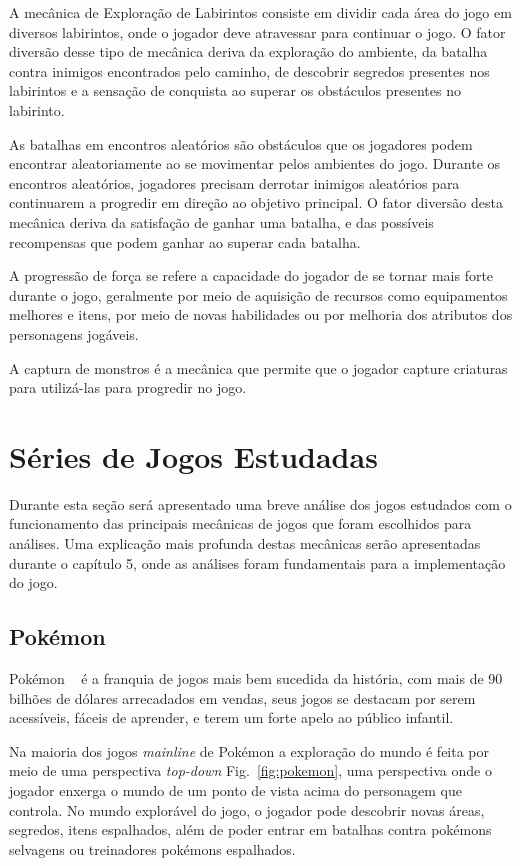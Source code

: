 \documentclass[
	12pt,				%
	openright,			%
	twoside,			%
	a4paper,			%
	english,			%
	french,				%
	spanish,			%
	brazil				%
	]{abntex2}
\begin{document}
	A mecânica de Exploração de Labirintos consiste em dividir cada área do jogo em diversos labirintos, onde o jogador deve atravessar para continuar o jogo. O fator diversão desse tipo de mecânica deriva da exploração do ambiente, da batalha contra inimigos encontrados pelo caminho, de descobrir segredos presentes nos labirintos e a sensação de conquista ao superar os obstáculos presentes no labirinto. 

	As batalhas em encontros aleatórios são obstáculos que os jogadores podem encontrar aleatoriamente ao se movimentar pelos ambientes do jogo. Durante os encontros aleatórios, jogadores precisam derrotar inimigos aleatórios para continuarem a progredir em direção ao objetivo principal. O fator diversão desta mecânica deriva da satisfação de ganhar uma batalha, e das possíveis recompensas que podem ganhar ao superar cada batalha.

	A progressão de força se refere a capacidade do jogador de se tornar mais forte durante o jogo, geralmente por meio de aquisição de recursos como equipamentos melhores e itens, por meio de novas habilidades ou por melhoria dos atributos dos personagens jogáveis. 

	A captura de monstros é a mecânica que permite que o jogador capture criaturas para utilizá-las para progredir no jogo.

\section{Séries de Jogos Estudadas}

Durante esta seção será apresentado uma breve análise dos jogos estudados com o funcionamento das principais mecânicas de jogos que foram escolhidos para análises. Uma explicação mais profunda destas mecânicas serão apresentadas durante o capítulo 5, onde as análises foram fundamentais para a implementação do jogo.

\subsection{Pokémon}

Pokémon ~\cite{Pkmn} é a franquia de jogos mais bem sucedida da história, com mais de 90 bilhões de dólares arrecadados em vendas, seus jogos se destacam por serem acessíveis, fáceis de aprender, e terem um forte apelo ao público infantil.

Na maioria dos jogos \emph{mainline} de Pokémon a exploração do mundo é feita por meio de uma perspectiva \emph{top-down} Fig.~\ref{fig:pokemon}, uma perspectiva onde o jogador enxerga o mundo de um ponto de vista acima do personagem que controla. No mundo explorável do jogo, o jogador pode descobrir novas áreas, segredos, itens espalhados, além de poder entrar em batalhas contra pokémons selvagens ou treinadores pokémons espalhados.
\end{document}
